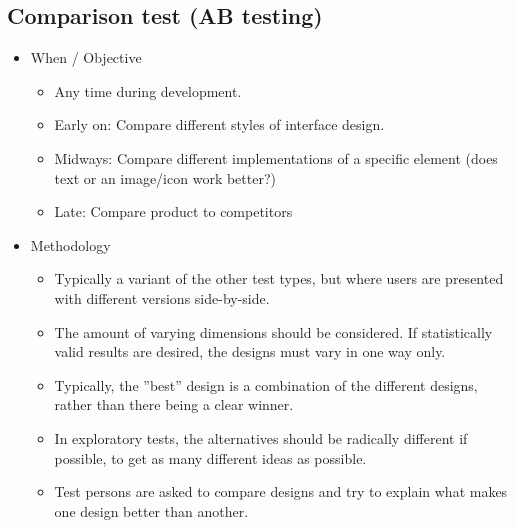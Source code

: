 \subsection{Comparison test (AB testing)}
\begin{itemize}
	\item When / Objective
	\begin{itemize}
		\item Any time during development.
		\item Early on: Compare different styles of interface design.
		\item Midways: Compare different implementations of a specific element (does text or an image/icon work better?)
		\item Late: Compare product to competitors
	\end{itemize}
	\item Methodology
	\begin{itemize}
		\item Typically a variant of the other test types, but where users are presented with different versions side-by-side.
		\item The amount of varying dimensions should be considered. If statistically valid results are desired, the designs must vary in one way only.
		\item Typically, the ''best'' design is a combination of the different designs, rather than there being a clear winner. 
		\item In exploratory tests, the alternatives should be radically different if possible, to get as many different ideas as possible. 
		\item Test persons are asked to compare designs and try to explain what makes one design better than another. 
	\end{itemize}
\end{itemize}


